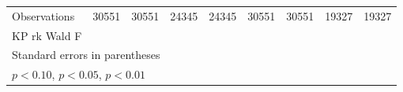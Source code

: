 \begin{table}[htbp]
\begin{tabular}{l*{8}{c}}
\hline
Observations&       30551         &       30551         &       24345         &       24345         &       30551         &       30551         &       19327         &       19327         \\
KP rk Wald F&                     &                     &                     &                     &                     &                     &                     &                     \\
\hline\hline
\multicolumn{9}{l}{\footnotesize Standard errors in parentheses}\\
\multicolumn{9}{l}{\footnotesize \sym{*} \(p<0.10\), \sym{**} \(p<0.05\), \sym{***} \(p<0.01\)}\\
\end{tabular}
\end{table}
